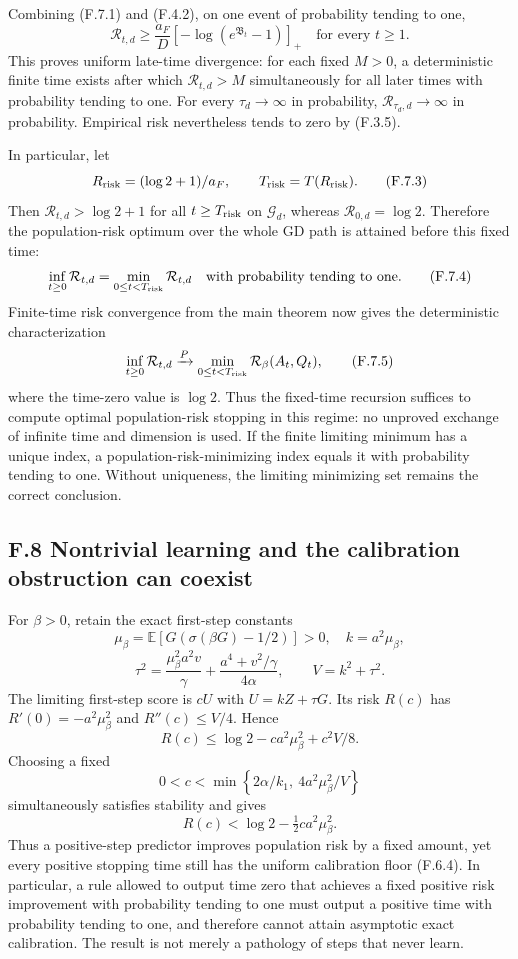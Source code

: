 \documentclass[
  11pt,
  a4paper,
]{article}
\begin{document}
Combining (F.7.1) and (F.4.2), on one event of probability tending to
one, \[
\mathcal R_{t,d}\ge\frac{a_F}{D}
\left[-\log(e^{\mathfrak B_t}-1)\right]_+
\quad\text{for every }t\ge1.
\tag{F.7.2}
\] This proves uniform late-time divergence: for each fixed \(M>0\), a
deterministic finite time exists after which \(\mathcal R_{t,d}>M\)
simultaneously for all later times with probability tending to one. For
every \(\tau_d\to\infty\) in probability,
\(\mathcal R_{\tau_d,d}\to\infty\) in probability. Empirical risk
nevertheless tends to zero by (F.3.5).

In particular, let \[
R_{\rm risk}=(\log2+1)/a_F,\qquad
T_{\rm risk}=T(R_{\rm risk}).
\tag{F.7.3}
\] Then \(\mathcal R_{t,d}>\log2+1\) for all \(t\ge T_{\rm risk}\) on
\(\mathcal G_d\), whereas \(\mathcal R_{0,d}=\log2\). Therefore the
population-risk optimum over the whole GD path is attained before this
fixed time: \[
\inf_{t\ge0}\mathcal R_{t,d}
=\min_{0\le t<T_{\rm risk}}\mathcal R_{t,d}
\quad\text{with probability tending to one}.
\tag{F.7.4}
\] Finite-time risk convergence from the main theorem now gives the
deterministic characterization \[
\inf_{t\ge0}\mathcal R_{t,d}
\xrightarrow{P}
\min_{0\le t<T_{\rm risk}}\mathcal R_\beta(A_t,Q_t),
\tag{F.7.5}
\] where the time-zero value is \(\log2\). Thus the fixed-time recursion
suffices to compute optimal population-risk stopping in this regime: no
unproved exchange of infinite time and dimension is used. If the finite
limiting minimum has a unique index, a population-risk-minimizing index
equals it with probability tending to one. Without uniqueness, the
limiting minimizing set remains the correct conclusion.

\hypertarget{f.8-nontrivial-learning-and-the-calibration-obstruction-can-coexist}{%
\subsection{F.8 Nontrivial learning and the calibration obstruction can
coexist}\label{f.8-nontrivial-learning-and-the-calibration-obstruction-can-coexist}}

For \(\beta>0\), retain the exact first-step constants \[
\mu_\beta=\mathbb E[G(\sigma(\beta G)-1/2)]>0,
\quad k=a^2\mu_\beta,
\] \[
\tau^2=\frac{\mu_\beta^2a^2v}{\gamma}
+\frac{a^4+v^2/\gamma}{4\alpha},\qquad V=k^2+\tau^2.
\tag{F.8.1}
\] The limiting first-step score is \(cU\) with \(U=kZ+\tau G\). Its
risk \(R(c)\) has \(R'(0)=-a^2\mu_\beta^2\) and \(R''(c)\le V/4\). Hence
\[
R(c)\le\log2-ca^2\mu_\beta^2+c^2V/8.
\] Choosing a fixed \[
0<c<\min\left\{2\alpha/k_1,\ 4a^2\mu_\beta^2/V\right\}
\tag{F.8.2}
\] simultaneously satisfies stability and gives \[
R(c)<\log2-\tfrac12ca^2\mu_\beta^2.
\tag{F.8.3}
\] Thus a positive-step predictor improves population risk by a fixed
amount, yet every positive stopping time still has the uniform
calibration floor (F.6.4). In particular, a rule allowed to output time
zero that achieves a fixed positive risk improvement with probability
tending to one must output a positive time with probability tending to
one, and therefore cannot attain asymptotic exact calibration. The
result is not merely a pathology of steps that never learn.
\end{document}
